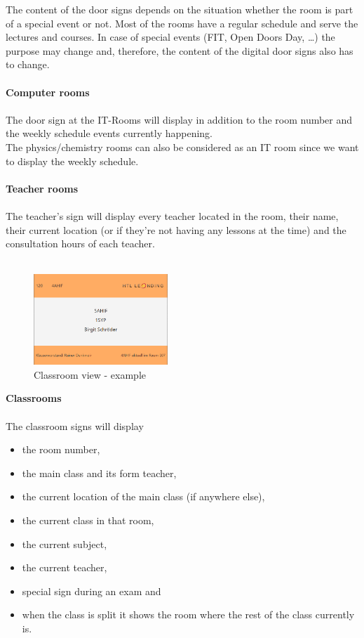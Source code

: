 \documentclass{article}
\newenvironment{explanation}{%
   \color{black}
}{}
\begin{document}
\begin{explanation}
The content of the door signs depends on the situation whether the room is part of a special event or not. Most of the rooms have a regular schedule and serve the lectures and courses. In case of special events (FIT, Open Doors Day, …) the purpose may change and, therefore, the content of the digital door signs also has to change.\\
\\
\textbf{Computer rooms} \\
\\
The door sign at the IT-Rooms will display in addition to the room number and the weekly schedule events currently happening.\\
The physics/chemistry rooms can also be considered as an IT room since we want to display the weekly schedule.\\
\\
\textbf{Teacher rooms} \\
\\
The teacher’s sign will display every teacher located in the room, their name, their current location (or if they’re not having any lessons at the time) and the consultation hours of each teacher.\\
\\

\begin{figure}
    \centering
    \includegraphics[width=0.45\textwidth]{images/views_examples/klassenview_normal.PNG}
    \caption{Classroom view - example}
\end{figure}


\textbf{Classrooms} \\
\\
The classroom signs will display 

\begin{itemize}
\item the room number, 
\item the main class and its form teacher,
\item the current location of the main class (if anywhere else), 
\item the current class in that room, 
\item the current subject, 
\item the current teacher,
\item special sign during an exam and
\item when the class is split it shows the room where the rest of the class currently is.
\end{itemize}


\end{explanation}
\end{document}
